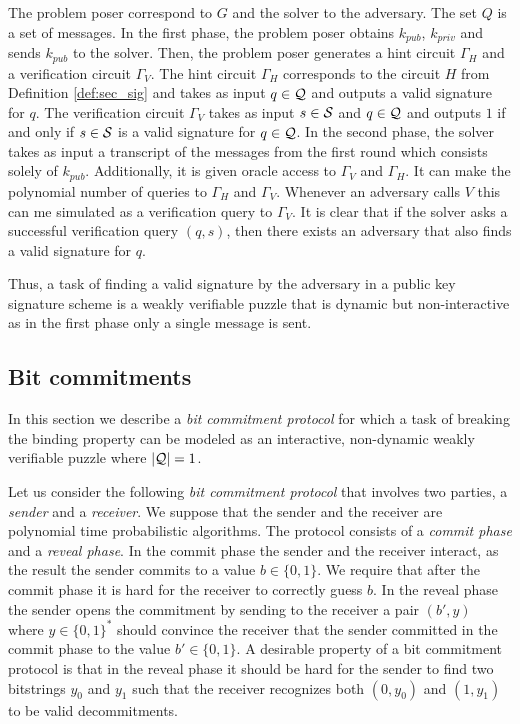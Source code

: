 The problem poser correspond to $G$ and the solver to the adversary. The set $Q$ is a set of messages.
In the first phase, the problem poser obtains $k_{pub}$, $k_{priv}$ and sends $k_{pub}$ to the solver.
Then, the problem poser generates a hint circuit $\Gamma_H$ and a verification circuit $\Gamma_V$.
The hint circuit $\Gamma_H$ corresponds to the circuit $H$ from Definition \ref{def:sec_sig} and takes as input $q \in \mathcal{Q}$ and outputs a valid signature for $q$.
The verification circuit $\Gamma_V$ takes as input $s \in \mathcal{S}$ and $q \in \mathcal{Q}$ and outputs $1$ if and only if $s \in \mathcal{S}$ is a valid signature for $q \in \mathcal{Q}$.
In the second phase, the solver takes as input a transcript of the messages from the first round which consists solely of $k_{pub}$.
Additionally, it is given oracle access to $\Gamma_V$ and $\Gamma_H$. It can make the polynomial number of queries to $\Gamma_H$ and $\Gamma_V$.
Whenever an adversary calls $V$ this can me simulated as a verification query to $\Gamma_V$.
It is clear that if the solver asks a successful verification query $(q,s)$,
then there exists an adversary that also finds a valid signature for $q$.

Thus, a task of finding a valid signature by the adversary in a public key signature scheme is a weakly verifiable puzzle that
is dynamic but non-interactive as in the first phase only a single message is sent.

\subsection{Bit commitments}
In this section we describe a \textit{bit commitment protocol}
for which a task of breaking the binding property can be modeled as an interactive, non-dynamic weakly verifiable puzzle where $|\mathcal{Q}| = 1$.

Let us consider the following \textit{bit commitment protocol} that involves two parties, a \textit{sender} and a \textit{receiver}.
We suppose that the sender and the receiver are polynomial time probabilistic algorithms.
The protocol consists of a \textit{commit phase} and a \textit{reveal phase}.
In the commit phase the sender and the receiver interact, as the result the sender commits to a value $b \in \{0,1\}$.
We require that after the commit phase it is hard for the receiver to correctly guess $b$.
In the reveal phase the sender opens the commitment by sending to the receiver a pair $(b', y)$ where $y \in \{0,1\}^{*}$
should convince the receiver that the sender committed in the commit phase to the value $b' \in \{0,1\}$.
A desirable property of a bit commitment protocol is that in the reveal phase it should be hard for
the sender to find two bitstrings $y_0$ and $y_1$ such that the receiver recognizes both $(0,y_0)$ and $(1, y_1)$ to be valid decommitments.

